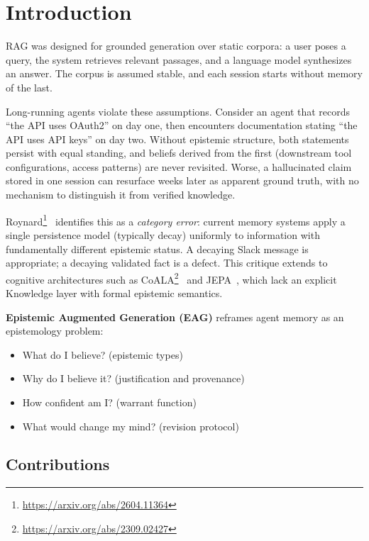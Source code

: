 \documentclass[11pt,letterpaper]{article}
\begin{document}
\section{Introduction}

RAG was designed for grounded generation over static corpora: a user poses a query, the system retrieves relevant passages, and a language model synthesizes an answer. The corpus is assumed stable, and each session starts without memory of the last.

Long-running agents violate these assumptions. Consider an agent that records ``the API uses OAuth2'' on day one, then encounters documentation stating ``the API uses API keys'' on day two. Without epistemic structure, both statements persist with equal standing, and beliefs derived from the first (downstream tool configurations, access patterns) are never revisited. Worse, a hallucinated claim stored in one session can resurface weeks later as apparent ground truth, with no mechanism to distinguish it from verified knowledge.

Roynard\footnote{\url{https://arxiv.org/abs/2604.11364}}~\cite{roynard2026} identifies this as a \textit{category error}: current memory systems apply a single persistence model (typically decay) uniformly to information with fundamentally different epistemic status. A decaying Slack message is appropriate; a decaying validated fact is a defect. This critique extends to cognitive architectures such as CoALA\footnote{\url{https://arxiv.org/abs/2309.02427}}~\cite{sumers2023coala} and JEPA~\cite{lecun2022path}, which lack an explicit Knowledge layer with formal epistemic semantics.

\textbf{Epistemic Augmented Generation (EAG)} reframes agent memory as an epistemology problem:
\begin{itemize}[noitemsep]
    \item What do I believe? (epistemic types)
    \item Why do I believe it? (justification and provenance)
    \item How confident am I? (warrant function)
    \item What would change my mind? (revision protocol)
\end{itemize}

\subsection{Contributions}
\end{document}
